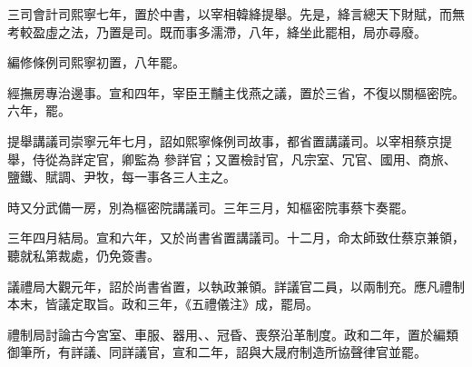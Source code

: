 \begin{pinyinscope}
 三司會計司熙寧七年，置於中書，以宰相韓絳提舉。先是，絳言總天下財賦，而無考較盈虛之法，乃置是司。既而事多濡滯，八年，絳坐此罷相，局亦尋廢。



 編修條例司熙寧初置，八年罷。



 經撫房專治邊事。宣和四年，宰臣王黼主伐燕之議，置於三省，不復以關樞密院。六年，罷。



 提舉講議司崇寧元年七月，詔如熙寧條例司故事，都省置講議司。以宰相蔡京提舉，侍從為詳定官，卿監為
 參詳官；又置檢討官，凡宗室、冗官、國用、商旅、鹽鐵、賦調、尹牧，每一事各三人主之。



 時又分武備一房，別為樞密院講議司。三年三月，知樞密院事蔡卞奏罷。



 三年四月結局。宣和六年，又於尚書省置講議司。十二月，命太師致仕蔡京兼領，聽就私第裁處，仍免簽書。



 議禮局大觀元年，詔於尚書省置，以執政兼領。詳議官二員，以兩制充。應凡禮制本末，皆議定取旨。政和三年，《五禮儀注》成，罷局。



 禮制局討論古今宮室、車服、器用、、冠昏、喪祭沿革制度。政和二年，置於編類御筆所，有詳議、同詳議官，宣和二年，詔與大晟府制造所協聲律官並罷。



\end{pinyinscope}